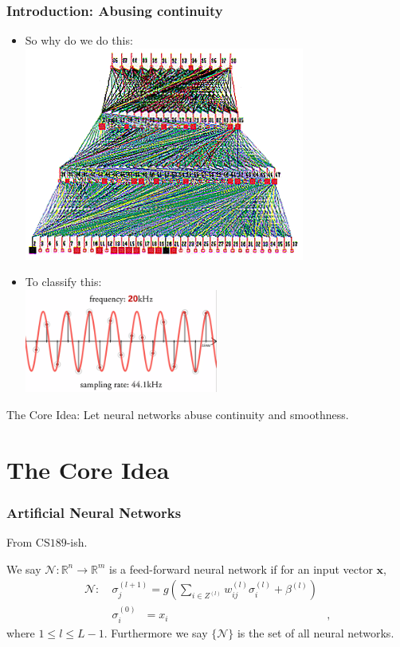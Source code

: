 \documentclass{beamer}
\begin{document}
\begin{frame}

\frametitle{Introduction: Abusing continuity}
\begin{itemize}
	\item So why do we do this: \\
	\includegraphics{sim2}
	\item To classify this:\\
	\includegraphics[width=0.5\textwidth]{20kHz-wave-Monty-Montgomery.png}
\end{itemize}

\end{frame}


\begin{frame}
\centering
\Huge{The Core Idea: Let neural networks abuse continuity and smoothness.}
\end{frame}

\section{The Core Idea}

\begin{frame}
\frametitle{Artificial Neural Networks}
From CS$189$-ish.
 \begin{definition}
    
    We say $\mathcal{N}: \mathbb{R}^n \to \mathbb{R}^m$ is a feed-forward neural network if for an input vector $\pmb{x}$,
    \begin{equation}
            \begin{aligned}
        \mathcal{N}:\ & \sigma_j^{(l+1)} = g\left(\sum_{i \in Z^{(l)}}w_{ij}^{(l)}\sigma_i^{(l)} + \beta^{(l)}\right) &\\  & \sigma_i^{(0)} \ \ \ =x_i& ,
        \end{aligned}
    \end{equation}
    where $1\leq l \leq L-1$. Furthermore we say $\{\mathcal{N}\}$ is the set of all neural networks.
    \end{definition}
\end{frame}
\end{document}
